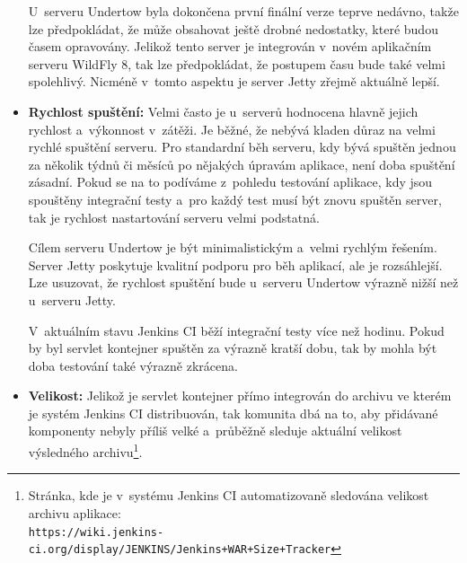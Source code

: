 \begin{itemize}
{                        U~serveru Undertow byla dokončena první finální verze teprve nedávno,
                        takže lze předpokládat, že může obsahovat ještě drobné nedostatky,
                        které budou časem opravovány. Jelikož tento server je integrován
                        v~novém aplikačním serveru WildFly 8, tak lze předpokládat,
                        že postupem času bude také velmi spolehlivý. 
                        Nicméně v~tomto aspektu je server Jetty zřejmě 
                        aktuálně lepší.}

                \item{\textbf{Rychlost spuštění:}  Velmi často je u~serverů hodnocena hlavně
                    jejich rychlost a~výkonnost v~zátěži. Je běžné, že nebývá kladen důraz na
                    velmi rychlé spuštění serveru. Pro standardní běh serveru, kdy bývá 
                    spuštěn jednou za několik týdnů či měsíců po nějakých úpravám aplikace,
                    není doba spuštění zásadní. Pokud se na to podíváme z~pohledu testování
                    aplikace, kdy jsou spouštěny integrační testy a~pro každý test musí být
                    znovu spuštěn server, tak je rychlost nastartování serveru velmi podstatná.
                    
                    Cílem serveru Undertow je být minimalistickým a~velmi rychlým 
                    řešením. Server Jetty poskytuje kvalitní podporu pro běh aplikací, ale je 
                    rozsáhlejší. 
                    Lze usuzovat, že rychlost spuštění bude u~serveru Undertow výrazně nižší
                    než u~serveru Jetty. 
                    

                    V~aktuálním stavu Jenkins CI běží integrační testy více než hodinu. Pokud 
                    by byl servlet kontejner spuštěn za výrazně kratší dobu, tak by mohla být doba testování
                     také výrazně zkrácena. 
                    }

                \item{\textbf{Velikost:} Jelikož je servlet kontejner přímo integrován do archivu ve kterém
                    je systém Jenkins CI distribuován, tak komunita dbá na to, aby přidávané komponenty
                    nebyly příliš velké a~průběžně sleduje aktuální velikost
                    výsledného archivu\footnote{Stránka, kde je v~systému Jenkins CI automatizovaně
                    sledována velikost archivu aplikace:\\ 
                    \texttt{https://wiki.jenkins-ci.org/display/JENKINS/Jenkins+WAR+Size+Tracker}}.  
                                       
}
\end{itemize}
